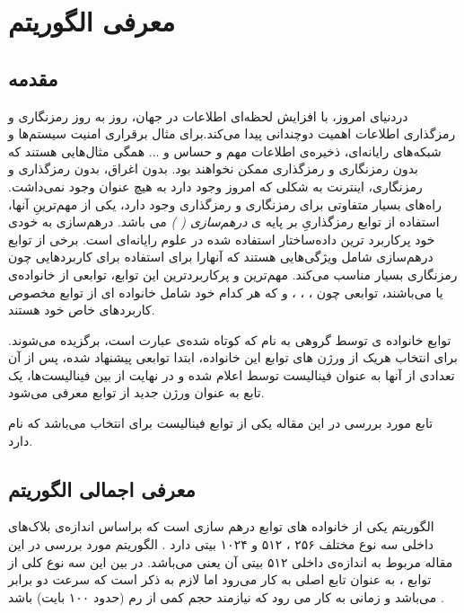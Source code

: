 \chapter{معرفی الگوریتم
}
\section{
مقدمه
}
دردنیای امروز، با افزایش لحظه‌ای اطلاعات در جهان، روز‌ به ‌روز رمزنگاری و رمزگذاری اطلاعات اهمیت دوچندانی پیدا می‌کند.برای مثال برقراری امنیت سیستم‌ها و شبکه‌های رایانه‌ای، ذخیره‌ی اطلاعات مهم و حساس و ... همگی مثال‌هایی هستند که بدون رمزنگاری و رمزگذاری ممکن نخواهند بود. بدون اغراق، بدون رمزگذاری و رمزنگاری، اینترنت به شکلی که امروز وجود دارد به هیچ عنوان وجود نمی‌داشت.
راه‌های بسیار متفاوتی برای رمزنگاری و رمزگذاری وجود دارد، یکی از مهم‌ترینِ آنها، استفاده از توابع رمزگذاریِ بر پایه ی
\textit{ 
	درهم‌سازی (
)
}
می باشد. درهم‌سازی به خودی خود پرکاربرد ترین داده‌ساختار استفاده شده در علوم رایانه‌ای است. برخی از توابع درهم‌سازی شامل ویژگی‌هایی هستند که آنهارا برای استفاده برای کاربرد‌هایی چون رمزنگاری بسیار مناسب می‌کند. مهم‌ترین و پرکاربردترین این توابع، توابعی از خانواده‌ی 
\textit{}
یا 
\textit{}
می‌باشند، توابعی چون 
،
،
،
و 
که هر کدام خود شامل خانواده ای از توابع مخصوص کاربرد‌های خاص خود هستند.

توابع خانواده ی 
توسط گروهی به نام 
\textit{}
که کوتاه شده‌ی عبارت
\textit{}
است، برگزیده می‌شوند. برای انتخاب هریک از ورژن های توابع این خانواده، ابتدا توابعی پیشنهاد شده، پس از آن تعدادی از آنها به عنوان فینالیست توسط 
اعلام شده و در نهایت از بین فینالیست‌ها، یک تابع به عنوان ورژن جدید از توابع 
معرفی می‌شود.

	تابع مورد بررسی در این مقاله یکی از توابع فینالیست برای انتخاب 
	می‌باشد که 
	نام دارد. 
	
\section{
معرفی اجمالی الگوریتم
}
الگوریتم 
\textit{ }
  یکی از خانواده های توابع درهم سازی است که  بر‌اساس اندازه‌ی بلاک‌های داخلی سه نوع مختلف ۲۵۶ ، ۵۱۲  و ۱۰۲۴ بیتی دارد  .
  الگوریتم مورد بررسی در این مقاله مربوط به اندازه‌ی داخلی ۵۱۲ بیتی آن یعنی
  می‌باشد. در بین این سه نوع کلی از توابع
  ،
 به عنوان تابع اصلی به کار می‌رود اما لازم به ذکر است که سرعت 
دو برابر
 می‌باشد و 
 زمانی به کار می رود که نیازمند حجم کمی از رم  (حدود ۱۰۰ بایت) باشد .
 
